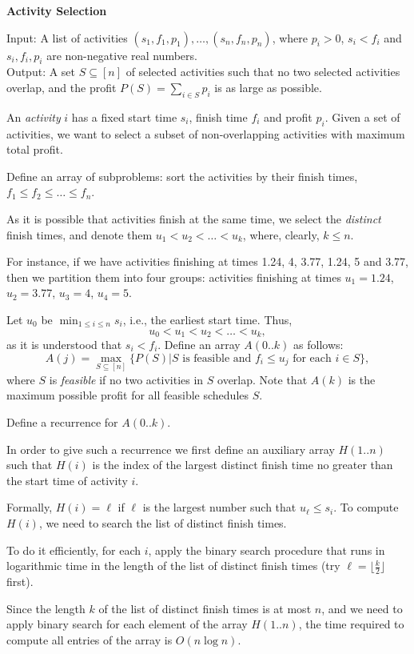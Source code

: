 \begin{frame}
{\bf Activity Selection}

Input: A list of activities $(s_1,f_1,p_1),\ldots,(s_n,f_n,p_n)$,
where $p_i>0$, $s_i<f_i$ and $s_i,f_i,p_i$ are non-negative real
numbers. \\

Output:  A set $S\subseteq[n]$ of
selected activities such that no two selected activities overlap, and
the profit $P(S)= \sum_{i \in S}p_i$ is as large as possible.

An {\em activity} $i$ has a fixed start time $s_i$, finish time $f_i$
and profit $p_i$.  Given a set of activities, we want to select a
subset of non-overlapping activities with maximum total profit.
\end{frame}

\begin{frame}
Define an array of subproblems: sort the activities by their finish
times, $f_1\leq f_2\leq\ldots\leq f_n$.

As it is possible that
activities finish at the same time, we select the {\em distinct}
finish times, and denote them $u_1<u_2<\ldots<u_k$, where, clearly,
$k\le n$.

For instance, if we have activities finishing at times
1.24, 4, 3.77, 1.24, 5 and 3.77, then we partition them into four
groups: activities finishing at times $u_1=1.24$, $u_2=3.77$, $u_3=4$,
$u_4=5$.
\end{frame}

\begin{frame}
Let $u_0$ be $\min_{1\leq i\leq n}s_i$, i.e., the earliest start time.
Thus,
$$
u_0<u_1<u_2<\ldots<u_k,
$$
as it is understood that $s_i<f_i$.
Define an array $A(0..k)$ as follows:
$$
A(j)=\max_{S\subseteq[n]} \{ P(S) | \mbox{$S$ is feasible
and $f_i\leq u_j$ for each $i\in S$} \},
$$
where $S$ is {\em feasible} if no two activities in $S$ overlap.
Note that $A(k)$ is the maximum possible profit for all feasible
schedules $S$.
\end{frame}

\begin{frame}
Define a recurrence for $A(0..k)$.

In order to give such a recurrence we first define an auxiliary
array $H(1..n)$ such that $H(i)$ is the index of the largest distinct
finish time no greater than the start time of activity $i$.

Formally, $H(i)=\ell$ if $\ell$ is the largest number such that
$u_\ell \leq s_i$. To compute $H(i)$, we need to search the list of
distinct finish times.

To do it efficiently, for each $i$, apply the binary search
procedure that runs in logarithmic time in the length of the list of
distinct finish times (try $\ell=\lfloor \frac{k}{2} \rfloor $
first).

Since the length $k$ of the list of distinct finish times is
at most $n$, and we need to apply binary search for each element of
the array $H(1..n)$, the time required to compute all entries of the
array is $O(n\log n)$.
\end{frame}


